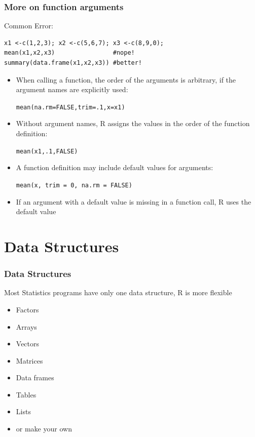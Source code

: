 \documentclass[xcolor={svgnames},10pt,
handout
]{beamer}
\begin{document}
\begin{frame}[fragile]
\frametitle{More on function arguments}
Common Error: 
\begin{lstlisting}
x1 <-c(1,2,3); x2 <-c(5,6,7); x3 <-c(8,9,0);
mean(x1,x2,x3)                #nope!
summary(data.frame(x1,x2,x3)) #better!
\end{lstlisting}
\begin{itemize}
	\item When calling a function, the order of the arguments is arbitrary, if the argument names are explicitly used:\\
	\begin{center} \lstinline|mean(na.rm=FALSE,trim=.1,x=x1)| \end{center}
	\item Without argument names, R assigns the values in the order of the function definition:\\
	\begin{center} \lstinline|mean(x1,.1,FALSE)| \end{center}
	\item A function definition may include default values for arguments:\\
	\begin{center}\lstinline|mean(x, trim = 0, na.rm = FALSE)|\end{center}
	\item If an argument with a default value is missing in a function call, R uses the default value
\end{itemize}
\end{frame}


\section{Data Structures}
\begin{frame}\frametitle{Data Structures}
Most Statistics programs have only one data structure, R is more flexible
\begin{itemize}
	\item Factors
	\item Arrays
	\item Vectors
	\item Matrices
	\item Data frames
	\item Tables 
	\item Lists
	\item or make your own
\end{itemize}
\end{frame}
\end{document}
